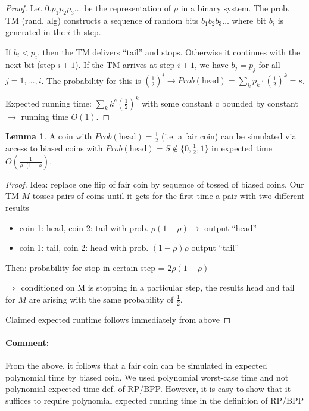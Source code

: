 \documentclass[11pt]{article}
\theoremstyle{definition}
\newtheorem{lemma}[theorem]{Lemma}
\theoremstyle{definition}
\begin{document}
\begin{proof}

Let $ 0.p_1 p_2 p_3\dots $ be the representation of $ \rho $ in a binary system. The prob. TM (rand. alg) constructs a sequence of random bits $b_1 b_2 b_3 \dots $ where bit $ b_i $ is generated in the $ i $-th step.

If $ b_i < p_i $, then the TM delivers ``tail'' and stops. Otherwise it continues with the next bit (step $ i + 1 $). If the TM arrives at step $ i + 1 $, we have $ b_j = p_j $ for all $ j = 1, \dots, i $.
The probability for this is $ (\frac{1}{2})^i \rightarrow Prob(\text{head}) = \sum \limits_k p_k \cdot (\frac{1}{2})^k = s $.

Expected running time: $ \sum \limits_k k^c (\frac{1}{2})^k $ with some constant c bounded by constant $ \rightarrow $ running time $ O (1) $.

\end{proof}

\begin{lemma}
A coin with $ Prob(\text{head}) = \frac{1}{2} $ (i.e. a fair coin) can be simulated via access to biased coins with $ Prob(\text{head}) = S \not \in \{0, \frac{1}{2}, 1\} $ in expected time $ O(\frac{1}{\rho \cdot (1- \rho}) $.
\end{lemma}

\begin{proof}
Idea: replace one flip of fair coin by sequence of tossed of biased coins. Our TM $ M $ tosses pairs of coins until it gets for the first time a pair with two different results
\begin{itemize}
\item coin 1: head, coin 2: tail with prob. $ \rho (1 - \rho) \rightarrow $ output ``head''
\item coin 1: tail, coin 2: head with prob. $ (1 - \rho) \rho $ output ``tail''
\end{itemize}
Then: probability for stop in certain step = $ 2 \rho (1 - \rho) $

$ \Rightarrow $ conditioned on M is stopping in a particular step, the results head and tail for $ M $ are arising with the same probability of $ \frac{1}{2} $.

Claimed expected runtime follows immediately from above
\end{proof}

\paragraph{Comment:} From the above, it follows that a fair coin can be simulated in expected polynomial time by biased coin. We used polynomial worst-case time and not polynomial expected time def. of RP/BPP. However, it is easy to show that it suffices to require polynomial expected running time in the definition of RP/BPP
\end{document}
